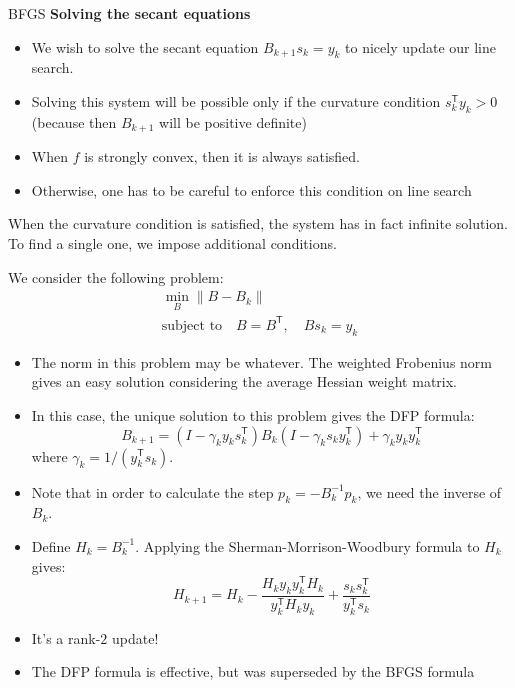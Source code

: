 \documentclass{beamer}
\newcommand{\tran}{\mathsf{T}}
\begin{document}
\begin{frame}[allowframebreaks]{BFGS}
	\textbf{Solving the secant equations}
	\begin{itemize}
		\item We wish to solve the secant equation $B_{k+1} s_k = y_k$ to nicely update our line search.
		\item Solving this system will be possible only if the curvature condition $s_k^\tran y_k >0$ (because then $B_{k+1}$ will be positive definite)
		\item When $f$ is strongly convex, then it is always satisfied.
		\item Otherwise, one has to be careful to enforce this condition on line search
	\end{itemize}

	When the curvature condition is satisfied, the system has in fact infinite solution. To find a single one, we impose additional conditions.

	\newpage
	
	We consider the following problem:
	\begin{subequations}
		\begin{gather}
			\min_B \| B- B_k \|\\
			\text{subject to}\quad B=B^\tran,\quad B s_k = y_k
		\end{gather}
	\end{subequations}

	\begin{itemize}
		\item The norm in this problem may be whatever. The weighted Frobenius norm gives an easy solution considering the average Hessian weight matrix.
		\item In this case, the unique solution to this problem gives the DFP formula:
		\begin{equation}
		B_{k+1} = (I- \gamma_k y_k s_k^\tran) B_k (I - \gamma_k s_k y_k^\tran) + \gamma_k y_k y_k^\tran
		\end{equation}
		where $\gamma_k = 1/(y_k^\tran s_k)$.
		\item Note that in order to calculate the step $p_k = -B_k^{-1} p_k$, we need the inverse of $B_k$.
		\item Define $H_k=B_k^{-1}$. Applying the Sherman-Morrison-Woodbury formula to $H_k$ gives: \[H_{k+1} = H_k - \frac{H_k y_k y_k^\tran H_k}{y_k^\tran H_k y_k} + \frac{s_k s_k^\tran}{y_k^\tran s_k}\]
		\item It's a rank-$2$ update!
		\item The DFP formula is effective, but was superseded by the BFGS formula
	\end{itemize}


\end{frame}
\end{document}
